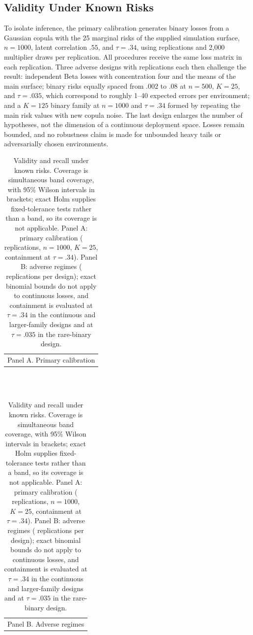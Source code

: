 \documentclass[twoside,11pt]{article}
\begin{document}
\subsection{Validity Under Known Risks}
\label{sec:calibration}
\label{sec:adverse}
To isolate inference, the primary calibration generates binary losses from a Gaussian copula
with the 25 marginal risks of the supplied simulation surface, $n=1000$, latent correlation
$.55$, and $\tau=.34$, using \CalibrationReps{} replications and 2,000 multiplier draws per
replication. All procedures receive the same loss matrix in each replication. Three adverse
designs with \StressReps{} replications each then challenge the result: independent Beta
losses with concentration four and the means of the main surface; binary risks equally spaced
from $.002$ to $.08$ at $n=500$, $K=25$, and $\tau=.035$, which correspond to roughly 1--40
expected errors per environment; and a $K=125$ binary family at $n=1000$ and $\tau=.34$ formed
by repeating the main risk values with new copula noise. The last design enlarges the number
of hypotheses, not the dimension of a continuous deployment space. Losses remain bounded, and
no robustness claim is made for unbounded heavy tails or adversarially chosen environments.

\begin{table}[t]
\centering\small\setlength{\tabcolsep}{3pt}
\caption{Validity and recall under known risks. Coverage is simultaneous band coverage, with
95\% Wilson intervals in brackets; exact Holm supplies fixed-tolerance tests rather than a band,
so its coverage is not applicable. Panel A: primary calibration (\CalibrationReps{}
replications, $n=1000$, $K=25$, containment at $\tau=.34$). Panel B: adverse regimes
(\StressReps{} replications per design); exact binomial bounds do not apply to continuous
losses, and containment is evaluated at $\tau=.34$ in the continuous and larger-family designs
and at $\tau=.035$ in the rare-binary design.}
\label{tab:cal}\label{tab:stress}
\begin{tabular}{l}Panel A. Primary calibration\end{tabular}\\[2pt]
\\[8pt]
\begin{tabular}{l}Panel B. Adverse regimes\end{tabular}\\[2pt]

\end{table}
\end{document}
